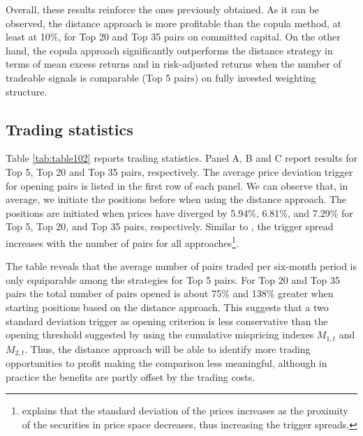 
Overall, these results reinforce the ones previously obtained. As it can be observed, the distance approach is more profitable than the copula method, at least at 10\%, for Top 20 and Top 35 pairs on committed capital. On the other hand, the copula approach significantly outperforms the distance strategy in terms of mean excess returns and in risk-adjusted returns when the number of tradeable signals is comparable (Top 5 pairs) on fully invested weighting structure.


\vspace{1.0cm}


	
	\subsection{Trading statistics}
	
	Table \ref{tab:table102} reports trading statistics. Panel A, B and C report results for Top 5, Top 20 and Top 35 pairs, respectively. The average price deviation trigger for opening pairs is listed in the first row of each panel. We can observe that, in average, we initiate the positions before when using the distance approach. The positions are initiated when prices have diverged by 5.94\%, 6.81\%, and 7.29\% for Top 5, Top 20, and Top 35 pairs, respectively. Similar to \citet*{ggr06}, the trigger spread increases with the number of pairs for all approaches\footnote{\citet*{ggr06} explains that the standard deviation of the prices increases as the proximity of the securities in price space decreases, thus increasing the trigger spreads.}.
	
	The table reveals that the average number of pairs traded per six-month period is only equiparable among the strategies for Top 5 pairs. For Top 20 and Top 35 pairs the total number of pairs opened is about 75\% and 138\% greater when starting positions based on the distance approach. This suggests that a two standard deviation trigger as opening criterion \citep{ggr06} is less conservative than the opening threshold suggested by \citet*{rf15} using the cumulative mispricing indexes $M_{1,t}$ and $M_{2,t}$. Thus, the distance approach will be able to identify more trading opportunities to profit making the comparison less meaningful, although in practice the benefits are partly offset by the trading costs.
	
